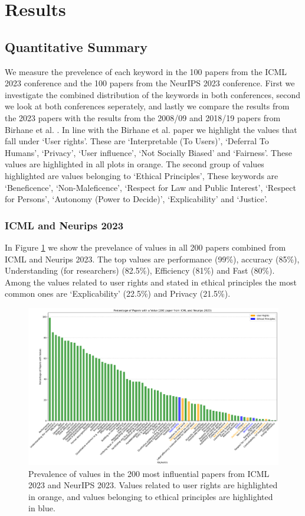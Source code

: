 \documentclass{article}
\begin{document}
\section{Results}
\subsection{Quantitative Summary}
We measure the prevelence of each keyword in the 100 papers from the ICML 2023 conference and the 100 papers from the NeurIPS 2023 conference. First we investigate the combined distribution of the keywords in both conferences, second we look at both conferences seperately,
and lastly we compare the results from the 2023 papers with the results from the 2008/09 and 2018/19 papers from Birhane et al. \cite{valuesInML2021}. 
In line with the Birhane et al. paper we highlight the values that fall under `User rights'. These are `Interpretable (To Users)', `Deferral To Humans', `Privacy', `User influence', `Not Socially Biased' and `Fairness'. 
These values are highlighted in all plots in orange. The second group of values highlighted are values belonging to `Ethical Principles', These keywords are `Beneficence', `Non-Maleficence', `Respect for Law and Public Interest', 
`Respect for Persons', `Autonomy (Power to Decide)', `Explicability' and `Justice'.
\subsubsection{ICML and Neurips 2023}
In Figure \ref{fig:percentage_both_conferences} we show the prevelance of values in all 200 papers combined from ICML and Neurips 2023. The top values are performance (99\%), accuracy (85\%), 
Understanding (for researchers) (82.5\%), Efficiency (81\%) and Fast (80\%). Among the values related to user rights and stated in 
ethical principles the most common ones are `Explicability' (22.5\%) and Privacy (21.5\%). 

\begin{figure}[H]
    \centering
    \includegraphics[width=\textwidth]{../plots/percentage_both_conferences.png}
    \caption{Prevalence of values in the 200 most influential papers from ICML 2023 and NeurIPS 2023. Values related to user rights are highlighted in orange, and values belonging to ethical principles are highlighted in blue.}
    \label{fig:percentage_both_conferences}
\end{figure}
\end{document}
